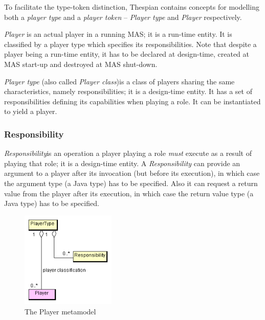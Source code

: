To facilitate the type-token distinction, Thespian contains concepts for modelling both a \textit{player type} and a \textit{player token} -- \textit{Player type} and \textit{Player} respectively.

\textit{Player} is an actual player in a running MAS; it is a run-time entity.
It is classified by a player type which specifies its responsibilities.
Note that despite a player being a run-time entity, it has to be declared at design-time, created at MAS start-up and destroyed at MAS shut-down.

\textit{Player type} (also called \textit{Player class})is a class of players sharing the same characteristics, namely responsibilities; it is a design-time entity.
It has a set of responsibilities defining its capabilities when playing a role.
It can be instantiated to yield a player. 

\subsubsection*{Responsibility}

\textit{Responsibility}is an operation a player playing a role \textit{must} execute as a result of playing that role; it is a design-time entity. 
A \textit{Responsibility} can provide an argument to a player after its invocation (but before its execution), in which case the argument type (a Java type) has to be specified.
Also it can request a return value from the player after its execution, in which case the return value type (a Java type) has to be specified.

\begin{figure}[ht]
	\centering
	\includegraphics[width=0.4\textwidth]{images/thespian/player-metamodel.png}
	\caption{The Player metamodel}
	\label{figure:thespian-player-metamodel}
\end{figure}

